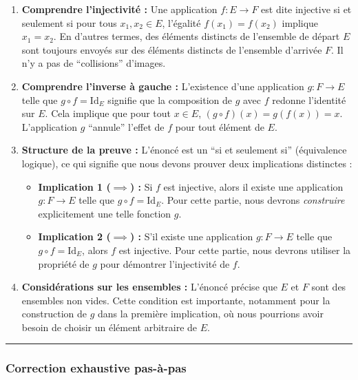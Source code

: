 \documentclass[12pt,a4paper]{report}
\providecommand{\tightlist}{%
  \setlength{\itemsep}{0pt}\setlength{\parskip}{0pt}}
\begin{document}
\begin{enumerate}
\def\labelenumi{\arabic{enumi}.}
\item
  \textbf{Comprendre l'injectivité :} Une application \(f: E \to F\) est
  dite injective si et seulement si pour tous \(x_1, x_2 \in E\),
  l'égalité \(f(x_1) = f(x_2)\) implique \(x_1 = x_2\). En d'autres
  termes, des éléments distincts de l'ensemble de départ \(E\) sont
  toujours envoyés sur des éléments distincts de l'ensemble d'arrivée
  \(F\). Il n'y a pas de ``collisions'' d'images.
\item
  \textbf{Comprendre l'inverse à gauche :} L'existence d'une application
  \(g: F \to E\) telle que \(g \circ f = \text{Id}_E\) signifie que la
  composition de \(g\) avec \(f\) redonne l'identité sur \(E\). Cela
  implique que pour tout \(x \in E\), \((g \circ f)(x) = g(f(x)) = x\).
  L'application \(g\) ``annule'' l'effet de \(f\) pour tout élément de
  \(E\).
\item
  \textbf{Structure de la preuve :} L'énoncé est un ``si et seulement
  si'' (équivalence logique), ce qui signifie que nous devons prouver
  deux implications distinctes :

  \begin{itemize}
  \tightlist
  \item
    \textbf{Implication 1 (\(\implies\)) :} Si \(f\) est injective,
    alors il existe une application \(g: F \to E\) telle que
    \(g \circ f = \text{Id}_E\). Pour cette partie, nous devrons
    \emph{construire} explicitement une telle fonction \(g\).
  \item
    \textbf{Implication 2 (\(\implies\)) :} S'il existe une
    application \(g: F \to E\) telle que \(g \circ f = \text{Id}_E\),
    alors \(f\) est injective. Pour cette partie, nous devrons utiliser
    la propriété de \(g\) pour démontrer l'injectivité de \(f\).
  \end{itemize}
\item
  \textbf{Considérations sur les ensembles :} L'énoncé précise que \(E\)
  et \(F\) sont des ensembles non vides. Cette condition est importante,
  notamment pour la construction de \(g\) dans la première implication,
  où nous pourrions avoir besoin de choisir un élément arbitraire de
  \(E\).
\end{enumerate}

\begin{center}\rule{0.5\linewidth}{0.5pt}\end{center}

\subsubsection{Correction exhaustive
pas-à-pas}\label{correction-exhaustive-pas-uxe0-pas}
\end{document}
